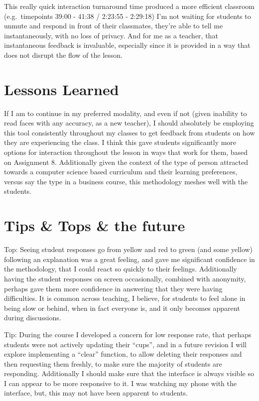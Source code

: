 \documentclass[paper=a4,justified,a4paper]{tufte-handout}
\begin{document}
This really quick interaction turnaround time produced a more efficient
classroom (e.g.~timepoints 39:00 - 41:38 / 2:23:55 - 2:29:18) I'm not
waiting for students to unmute and respond in front of their classmates,
they're able to tell me instantaneously, with no loss of privacy. And
for me as a teacher, that instantaneous feedback is invaluable,
especially since it is provided in a way that does not disrupt the flow
of the lesson.

\hypertarget{lessons-learned}{%
\section{Lessons Learned}\label{lessons-learned}}

If I am to continue in my preferred modality, and even if not (given
inability to read faces with any accuracy, as a new teacher), I should
absolutely be employing this tool consistently throughout my classes to
get feedback from students on how they are experiencing the class. I
think this gave students significantly more options for interaction
throughout the lesson in ways that work for them, based on Assignment 8.
Additionally given the context of the type of person attracted towards a
computer science based curriculum and their learning preferences, versus
say the type in a business course, this methodology meshes well with the
students.

\hypertarget{tips-tops-the-future}{%
\section{Tips \& Tops \& the future}\label{tips-tops-the-future}}

Top: Seeing student responses go from yellow and red to green (and some
yellow) following an explanation was a great feeling, and gave me
significant confidence in the methodology, that I could react so quickly
to their feelings. Additionally having the student responses on screen
occasionally, combined with anonymity, perhaps gave them more confidence
in answering that they were having difficulties. It is common across
teaching, I believe, for students to feel alone in being slow or behind,
when in fact everyone is, and it only becomes apparent during
discussions.

Tip: During the course I developed a concern for low response rate, that
perhaps students were not actively updating their ``cups'', and in a
future revision I will explore implementing a ``clear'' function, to
allow deleting their responses and then requesting them freshly, to make
sure the majority of students are responding. Additionally I should make
sure that the interface is always visible so I can appear to be more
responsive to it. I was watching my phone with the interface, but, this
may not have been apparent to students.
\end{document}
